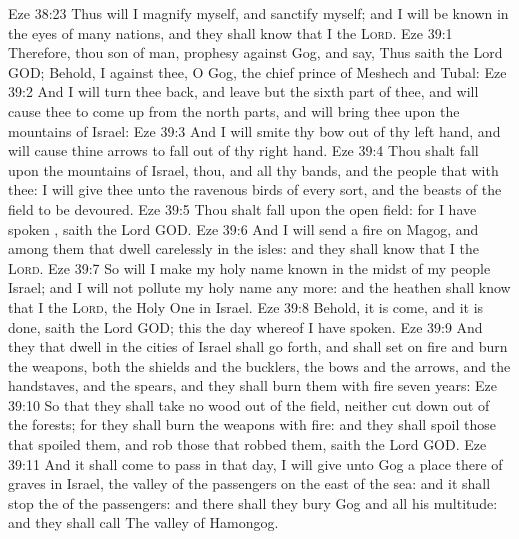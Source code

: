 \vs Eze 38:23 Thus will I magnify myself, and sanctify myself; and I will be known in the eyes of many nations, and they shall know that I  the \textsc{Lord}.
\vs Eze 39:1 Therefore, thou son of man, prophesy against Gog, and say, Thus saith the Lord GOD; Behold, I  against thee, O Gog, the chief prince of Meshech and Tubal:
\vs Eze 39:2 And I will turn thee back, and leave but the sixth part of thee, and will cause thee to come up from the north parts, and will bring thee upon the mountains of Israel:
\vs Eze 39:3 And I will smite thy bow out of thy left hand, and will cause thine arrows to fall out of thy right hand.
\vs Eze 39:4 Thou shalt fall upon the mountains of Israel, thou, and all thy bands, and the people that  with thee: I will give thee unto the ravenous birds of every sort, and  the beasts of the field to be devoured.
\vs Eze 39:5 Thou shalt fall upon the open field: for I have spoken , saith the Lord GOD.
\vs Eze 39:6 And I will send a fire on Magog, and among them that dwell carelessly in the isles: and they shall know that I  the \textsc{Lord}.
\vs Eze 39:7 So will I make my holy name known in the midst of my people Israel; and I will not  pollute my holy name any more: and the heathen shall know that I  the \textsc{Lord}, the Holy One in Israel.
\vs Eze 39:8 Behold, it is come, and it is done, saith the Lord GOD; this  the day whereof I have spoken.
\vs Eze 39:9 And they that dwell in the cities of Israel shall go forth, and shall set on fire and burn the weapons, both the shields and the bucklers, the bows and the arrows, and the handstaves, and the spears, and they shall burn them with fire seven years:
\vs Eze 39:10 So that they shall take no wood out of the field, neither cut down  out of the forests; for they shall burn the weapons with fire: and they shall spoil those that spoiled them, and rob those that robbed them, saith the Lord GOD.
\vs Eze 39:11 And it shall come to pass in that day,  I will give unto Gog a place there of graves in Israel, the valley of the passengers on the east of the sea: and it shall stop the  of the passengers: and there shall they bury Gog and all his multitude: and they shall call  The valley of Hamongog.

